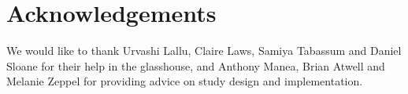 \documentclass[12pt,a4paper]{memoir}
\begin{document}
\section*{Acknowledgements}
We would like to thank Urvashi Lallu, Claire Laws, Samiya Tabassum and Daniel Sloane for their help in the glasshouse, and Anthony Manea, Brian Atwell and Melanie Zeppel for providing advice on study design and implementation.

\renewcommand\bibname{{References}} 
\begin{small}


\end{small}
\end{document}
